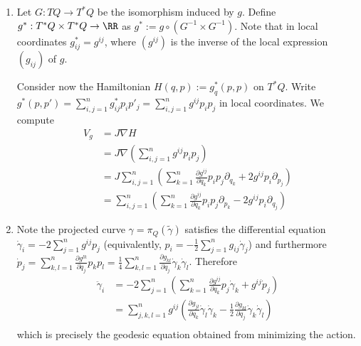 
 
\begin{enumerate}
    \item Let $G:TQ\to T^*Q$ be the isomorphism induced by $g$. Define $g^*:T^*Q\times T^*Q \to \RR$  as $g^*:=g\circ (G^{-1}\times G^{-1})$. Note that in local coordinates $g^*_{ij}=g^{ij}$, where $(g^{ij})$ is the inverse of the local expression $(g_{ij})$ of $g$.
    
    Consider now the Hamiltonian $H(q,p):=g_q^*(p,p)$ on $T^*Q$. Write $g^*(p,p')=\sum_{i,j=1}^n g^*_{ij}p_i p'_j=\sum_{i,j=1}^n g^{ij}p_i p_j$ in local coordinates. We compute
    \begin{align*}
        V_g&=J\nabla H\\
        &=J\nabla\left(\sum_{i,j=1}^n g^{ij}p_ip_j\right)\\
        &=J\sum_{i,j=1}^n\left(\sum_{k=1}^n\frac{\partial g^{ij}}{\partial q_k} p_ip_j\partial_{q_k}+2g^{ij}p_i\partial_{p_j}\right)\\
        &=\sum_{i,j=1}^n\left(\sum_{k=1}^n\frac{\partial g^{ij}}{\partial q_k} p_ip_j\partial_{p_k}-2g^{ij}p_i\partial_{q_j}\right)
    \end{align*}
    
    \item Note the projected curve $\gamma=\pi_Q(\tilde\gamma)$ satisfies the differential equation $\dot\gamma_i=-2\sum_{j=1}^n g^{ij}p_j$ (equivalently, $p_i=-\frac{1}{2}\sum_{j=1}^n g_{ij} \dot \gamma_j$) and furthermore $\dot p_j=\sum_{k,l=1}^n \frac{\partial g^{lk}}{\partial q_j}p_kp_l=\frac{1}{4}\sum_{k,l=1}^n\frac{\partial g_{kl}}{\partial q_j}\dot\gamma_k\dot\gamma_l$. Therefore
    \begin{align*}
        \ddot\gamma_i&=-2\sum_{j=1}^n \left(\sum_{k=1}^n \frac{\partial g^{ij}}{\partial q_k}p_j\dot\gamma_k+g^{ij}\dot p_j\right)\\
        &=\sum_{j,k,l=1}^ng^{ij}\left(\frac{\partial g_{jl}}{\partial q_k}\dot\gamma_l\dot\gamma_k-\frac{1}{2}\frac{\partial g_{kl}}{\partial q_j}\dot\gamma_k\dot\gamma_l\right)\\
    \end{align*}
    which is precisely the geodesic equation obtained from minimizing the action.
    

\end{enumerate}
